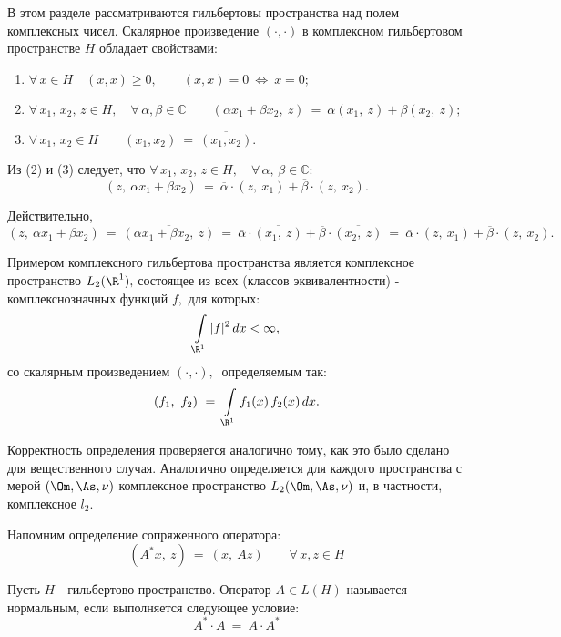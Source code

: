 \documentclass[a4paper]{article}
\newcommand{\mro} {\R^1}
\newcommand{\il} {\int\limits_}
\begin{document}
В этом разделе рассматриваются гильбертовы пространства над полем
комплексных чисел. Скалярное произведение $(\cdot, \cdot)$ в
комплексном гильбертовом пространстве $H$ обладает свойствами:
\begin{enumerate}
\item $\forall \, x\in H \quad (x, x) \geqslant 0, \qquad (x, x) =
0 \ \Leftrightarrow\  x = 0; $

\item $\forall \, x_1,\, x_2,\, z\in H, \quad \forall \, \alpha,
\beta \in \mathbb{C}\qquad (\alpha x_1 + \beta x_2, \ z)\ = \
\alpha (x_1, \ z) + \beta (x_2, \ z);$

\item $\forall \, x_1, \, x_2 \in H \qquad (x_1, x_2) \ = \
\overline{(x_1, x_2)}.$

\end{enumerate}

Из (2) и (3) следует, что $\forall \, x_1, \, x_2, \, z \in H,
\quad \forall \, \alpha, \, \beta \in \mathbb{C}:$
$$
(z, \ \alpha x_1 + \beta x_2)\ = \ \overline{\alpha} \cdot (z,\
x_1) + \overline{\beta} \cdot (z, \ x_2).
$$

Действительно,
$$
(z, \ \alpha x_1 + \beta x_2 )\ = \ \overline{(\alpha x_1 + \beta
x_2, \ z)}\ = \ \overline{\alpha} \cdot \overline{(x_1, \ z)} +
\overline{\beta} \cdot \overline{(x_2, \ z)}\ = \
\overline{\alpha} \cdot (z,\ x_1) + \overline{\beta} \cdot (z, \
x_2).
$$

Примером комплексного гильбертова пространства является
комплексное пространство $L_2 (\mro),$  состоящее из всех (классов
эквивалентности) - комплекснозначных функций  $f,$ для которых:
$$
\il{\mro} |f|^2 \, dx < \infty,
$$
со скалярным произведением $(\cdot, \cdot),\ $ определяемым так:
$$
(f_1, \ f_2)\ = \ \il{\mro} f_1 (x) \, f_2 (x) \, dx.
$$

Корректность определения проверяется аналогично тому, как это было
сделано для вещественного случая. Аналогично определяется для
каждого пространства с мерой $(\Om, \As, \nu)$
комплексное пространство  $L_2 (\Om, \As, \nu)$ и, в
частности, комплексное $l_2.$


Напомним определение сопряженного оператора:
$$
(A^{*}x, \ z)\ = \ (x, \ Az) \qquad \forall\, x, z\in H
$$

\begin{df}
Пусть $H$ - гильбертово пространство. Оператор $A\in L(H)$
называется нормальным, если выполняется следующее условие:
$$
A^{*} \cdot A\ = \ A \cdot A^{*}
$$


\end{df}
\end{document}
